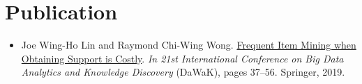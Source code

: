 \documentclass[10pt, oneside]{article}
\begin{document}
\section*{Publication}
\begin{itemize}
	\item Joe Wing-Ho Lin and Raymond Chi-Wing Wong. \href{https://link.springer.com/chapter/10.1007/978-3-030-27520-4_4}{Frequent Item Mining when Obtaining Support is Costly}. \textit{In 21st International Conference on Big Data Analytics and Knowledge Discovery} (DaWaK), pages 37--56. Springer, 2019.	
	
\end{itemize}



\end{document}
